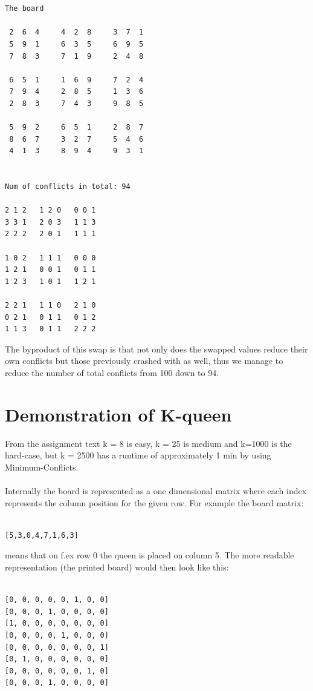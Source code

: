 \documentclass[12pt, a4paper]{article}
\begin{document}
\begin{verbatim}


The board

 2  6  4     4  2  8     3  7  1 
 5  9  1     6  3  5     6  9  5 
 7  8  3     7  1  9     2  4  8 

 6  5  1     1  6  9     7  2  4 
 7  9  4     2  8  5     1  3  6 
 2  8  3     7  4  3     9  8  5 

 5  9  2     6  5  1     2  8  7 
 8  6  7     3  2  7     5  4  6 
 4  1  3     8  9  4     9  3  1 


Num of conflicts in total: 94

2 1 2 	1 2 0 	0 0 1 
3 3 1 	2 0 3 	1 1 3 
2 2 2 	2 0 1 	1 1 1 

1 0 2 	1 1 1 	0 0 0 
1 2 1 	0 0 1 	0 1 1 
1 2 3 	1 0 1 	1 2 1 

2 2 1 	1 1 0 	2 1 0 
0 2 1 	0 1 1 	0 1 2 
1 1 3 	0 1 1 	2 2 2 

\end{verbatim}

\noindent 
The byproduct of this swap is that not only does the swapped values reduce their own conflicts but those previously crashed with as well, thus we manage to reduce the number of total conflicts from 100 down to 94.

\section{Demonstration of K-queen}
From the assignment text k = 8 is easy, k = 25 is medium and k=1000 is the hard-case, but k = 2500 has a runtime of approximately 1 min by using Minimum-Conflicts.
\\\\
Internally the board is represented as a one dimensional matrix where each index represents the column position for the given row. For example the board matrix:

\begin{verbatim}

[5,3,0,4,7,1,6,3]

\end{verbatim}
\noindent
means that on f.ex row 0 the queen is placed on column 5. The more readable representation (the printed board) would then look like this:

\begin{verbatim}

[0, 0, 0, 0, 0, 1, 0, 0]
[0, 0, 0, 1, 0, 0, 0, 0]
[1, 0, 0, 0, 0, 0, 0, 0]
[0, 0, 0, 0, 1, 0, 0, 0]
[0, 0, 0, 0, 0, 0, 0, 1]
[0, 1, 0, 0, 0, 0, 0, 0]
[0, 0, 0, 0, 0, 0, 1, 0]
[0, 0, 0, 1, 0, 0, 0, 0]

\end{verbatim}
\end{document}
